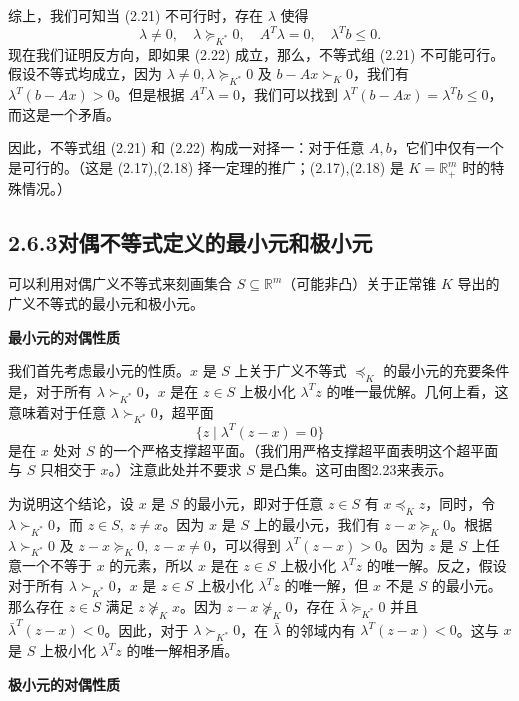 \documentclass[UTF8,12pt,a4paper,fontset=fandol]{ctexart}
\begin{document}
综上，我们可知当 (2.21) 不可行时，存在 $\lambda$ 使得
\begin{equation}
  \lambda\ne0,\quad \lambda\succeq_{K^*}0,\quad A^T\lambda=0,\quad \lambda^Tb\le0.
  \tag{2.22}
\end{equation}
现在我们证明反方向，即如果 (2.22) 成立，那么，不等式组 (2.21) 不可能可行。假设不等式均成立，因为 $\lambda\ne0,\lambda\succeq_{K^*}0$ 及 $b-Ax\succ_K0$，我们有 $\lambda^T(b-Ax)>0$。但是根据 $A^T\lambda=0$，我们可以找到 $\lambda^T(b-Ax)=\lambda^Tb\le0$，而这是一个矛盾。

因此，不等式组 (2.21) 和 (2.22) 构成一对择一：对于任意 $A,b$，它们中仅有一个是可行的。（这是 (2.17),(2.18) 择一定理的推广；(2.17),(2.18) 是 $K=\mathbb{R}_+^m$ 时的特殊情况。）

\subsection*{2.6.3\quad 对偶不等式定义的最小元和极小元}

可以利用对偶广义不等式来刻画集合 $S\subseteq\mathbb{R}^m$（可能非凸）关于正常锥 $K$ 导出的广义不等式的最小元和极小元。

\noindent\textbf{最小元的对偶性质}

我们首先考虑最小元的性质。$x$ 是 $S$ 上关于广义不等式 $\preceq_K$ 的最小元的充要条件是，对于所有 $\lambda\succ_{K^*}0$，$x$ 是在 $z\in S$ 上极小化 $\lambda^Tz$ 的唯一最优解。几何上看，这意味着对于任意 $\lambda\succ_{K^*}0$，超平面
\[
  \{z\mid \lambda^T(z-x)=0\}
\]
是在 $x$ 处对 $S$ 的一个严格支撑超平面。（我们用严格支撑超平面表明这个超平面与 $S$ 只相交于 $x$。）注意此处并不要求 $S$ 是凸集。这可由图2.23来表示。

为说明这个结论，设 $x$ 是 $S$ 的最小元，即对于任意 $z\in S$ 有 $x\preceq_K z$，同时，令 $\lambda\succ_{K^*}0$，而 $z\in S,\ z\ne x$。因为 $x$ 是 $S$ 上的最小元，我们有 $z-x\succeq_K0$。根据 $\lambda\succ_{K^*}0$ 及 $z-x\succeq_K0,\ z-x\ne0$，可以得到 $\lambda^T(z-x)>0$。因为 $z$ 是 $S$ 上任意一个不等于 $x$ 的元素，所以 $x$ 是在 $z\in S$ 上极小化 $\lambda^Tz$ 的唯一解。反之，假设对于所有 $\lambda\succ_{K^*}0$，$x$ 是 $z\in S$ 上极小化 $\lambda^Tz$ 的唯一解，但 $x$ 不是 $S$ 的最小元。那么存在 $z\in S$ 满足 $z\not\succeq_K x$。因为 $z-x\not\succeq_K0$，存在 $\bar{\lambda}\succeq_{K^*}0$ 并且 $\bar{\lambda}^T(z-x)<0$。因此，对于 $\lambda\succ_{K^*}0$，在 $\bar{\lambda}$ 的邻域内有 $\lambda^T(z-x)<0$。这与 $x$ 是 $S$ 上极小化 $\lambda^Tz$ 的唯一解相矛盾。

\noindent\textbf{极小元的对偶性质}
\end{document}
